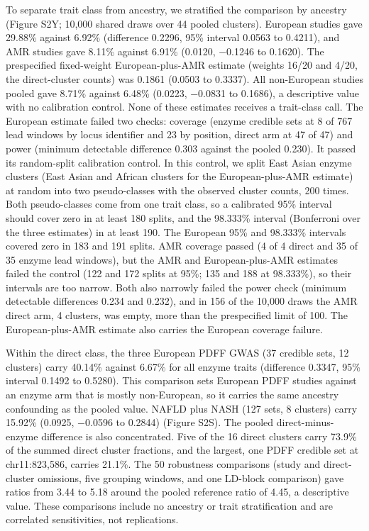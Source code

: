 To separate trait class from ancestry, we stratified the comparison by ancestry (Figure S2Y; 10,000 shared draws over 44 pooled clusters). European studies gave 29.88\% against 6.92\% (difference 0.2296, 95\% interval 0.0563 to 0.4211), and AMR studies gave 8.11\% against 6.91\% (0.0120, −0.1246 to 0.1620). The prespecified fixed-weight European-plus-AMR estimate (weights 16/20 and 4/20, the direct-cluster counts) was 0.1861 (0.0503 to 0.3337). All non-European studies pooled gave 8.71\% against 6.48\% (0.0223, −0.0831 to 0.1686), a descriptive value with no calibration control. None of these estimates receives a trait-class call. The European estimate failed two checks: coverage (enzyme credible sets at 8 of 767 lead windows by locus identifier and 23 by position, direct arm at 47 of 47) and power (minimum detectable difference 0.303 against the pooled 0.230). It passed its random-split calibration control. In this control, we split East Asian enzyme clusters (East Asian and African clusters for the European-plus-AMR estimate) at random into two pseudo-classes with the observed cluster counts, 200 times. Both pseudo-classes come from one trait class, so a calibrated 95\% interval should cover zero in at least 180 splits, and the 98.333\% interval (Bonferroni over the three estimates) in at least 190. The European 95\% and 98.333\% intervals covered zero in 183 and 191 splits. AMR coverage passed (4 of 4 direct and 35 of 35 enzyme lead windows), but the AMR and European-plus-AMR estimates failed the control (122 and 172 splits at 95\%; 135 and 188 at 98.333\%), so their intervals are too narrow. Both also narrowly failed the power check (minimum detectable differences 0.234 and 0.232), and in 156 of the 10,000 draws the AMR direct arm, 4 clusters, was empty, more than the prespecified limit of 100. The European-plus-AMR estimate also carries the European coverage failure.

Within the direct class, the three European PDFF GWAS (37 credible sets, 12 clusters) carry 40.14\% against 6.67\% for all enzyme traits (difference 0.3347, 95\% interval 0.1492 to 0.5280). This comparison sets European PDFF studies against an enzyme arm that is mostly non-European, so it carries the same ancestry confounding as the pooled value. NAFLD plus NASH (127 sets, 8 clusters) carry 15.92\% (0.0925, −0.0596 to 0.2844) (Figure S2S). The pooled direct-minus-enzyme difference is also concentrated. Five of the 16 direct clusters carry 73.9\% of the summed direct cluster fractions, and the largest, one PDFF credible set at chr11:823,586, carries 21.1\%. The 50 robustness comparisons (study and direct-cluster omissions, five grouping windows, and one LD-block comparison) gave ratios from 3.44 to 5.18 around the pooled reference ratio of 4.45, a descriptive value. These comparisons include no ancestry or trait stratification and are correlated sensitivities, not replications.

